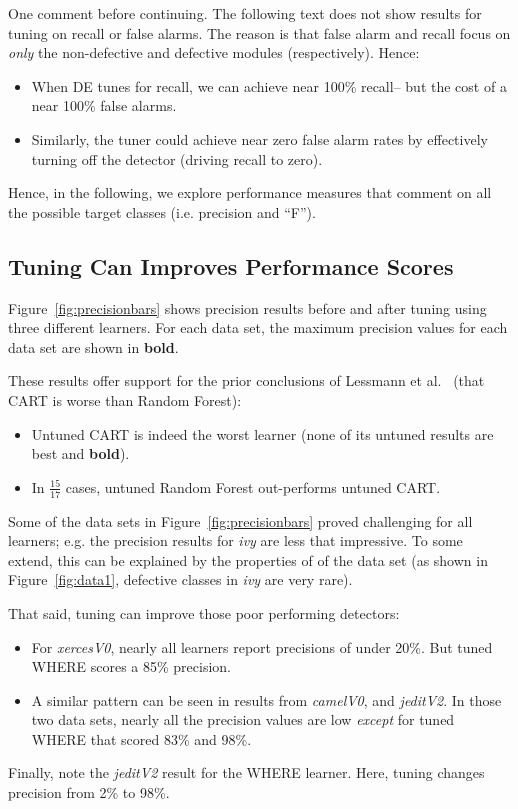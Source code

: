 \documentclass{sig-alternative}
\newcommand{\bi}{\begin{itemize}[leftmargin=0.4cm]}
\newcommand{\ei}{\end{itemize}}
\newcommand{\fig}[1]{Figure~\ref{fig:#1}}
\begin{document}
One comment before continuing. The following text does not
show results for tuning on recall
or false alarms. The reason is that false alarm and recall focus on {\em only}
the non-defective and defective modules (respectively). Hence:
\bi
\item
When DE tunes for recall, we can achieve near
100\% recall-- but the cost of a near 100\% false alarms.
\item
Similarly, the tuner
could achieve near zero false alarm rates by effectively turning off
the detector (driving recall to zero).
\ei
Hence, in the
following, we explore performance measures that comment on all the possible
target classes (i.e. precision and ``F''). 

\subsection{Tuning Can  Improves Performance Scores}\label{sect:precision}

\fig{precisionbars} shows precision results before and after tuning using three different learners.
For each data set, the maximum precision values for each data set are shown in {\bf bold}.


These results offer support for the prior conclusions of  
 Lessmann et al.~\cite{lessmann2008benchmarking} (that CART is worse than Random Forest):
\bi
\item
Untuned CART is indeed the worst learner (none of its
untuned results are best and {\bf bold}). 
\item 
In $\frac{15}{17}$ cases, untuned Random Forest out-performs  untuned CART.  
\ei
Some of the data sets in \fig{precisionbars} proved challenging for all learners;
e.g. the precision results for {\em ivy} are less
that impressive.
To some extend, this can be explained by
the properties of of the data set (as shown in \fig{data1}, defective classes in {\em ivy} are very rare).

That said,  tuning can improve those poor performing detectors:
\bi
\item
For {\em xercesV0}, nearly all learners report precisions of under 20\%. But tuned  WHERE scores a 85\% precision.  
\item A similar pattern can be seen in results from {\em camelV0},   and {\em jeditV2}.
In those two data sets, nearly all the precision values are   low {\em except} for
tuned WHERE that scored 83\% and 98\%.
\ei
Finally, note the  {\em jeditV2} result for the WHERE learner.
Here, tuning changes precision from 2\% to 98\%.
\end{document}
